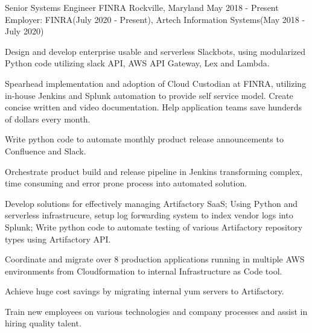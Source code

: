 

\begin{cventries}

  \cventryemp
    {Senior Systems Engineer} %
    {FINRA} %
    {Rockville, Maryland} %
    {May 2018 - Present} %
    {Employer: FINRA(July 2020 - Present), Artech Information Systems(May 2018 - July 2020)}
    {
      \begin{cvitems} %
        \item {Design and develop enterprise usable and serverless Slackbots, using modularized Python code utilizing slack API, AWS API Gateway, Lex and Lambda.}
        \item {Spearhead implementation and adoption of Cloud Custodian at FINRA, utilizing in-house Jenkins and Splunk automation to provide self service model. Create concise written and video documentation. Help application teams save hunderds of dollars every month.}
        \item {Write python code to automate monthly product release announcements to Confluence and Slack.}
        \item {Orchestrate product build and release pipeline in Jenkins transforming complex, time consuming and error prone process into automated solution.}
        \item {Develop solutions for effectively managing Artifactory SaaS; Using Python and serverless infrastrucure, setup log forwarding system to index vendor logs into Splunk; Write python code to automate testing of various Artifactory repository types using Artifactory API.}
        \item {Coordinate and migrate over 8 production applications running in multiple AWS environments from Cloudformation to internal Infrastructure as Code tool.}
        \item {Achieve huge cost savings by migrating internal yum servers to Artifactory.}
        \item {Train new employees on various technologies and company processes and assist in hiring quality talent.}
      \end{cvitems}
    }


\end{cventries}
